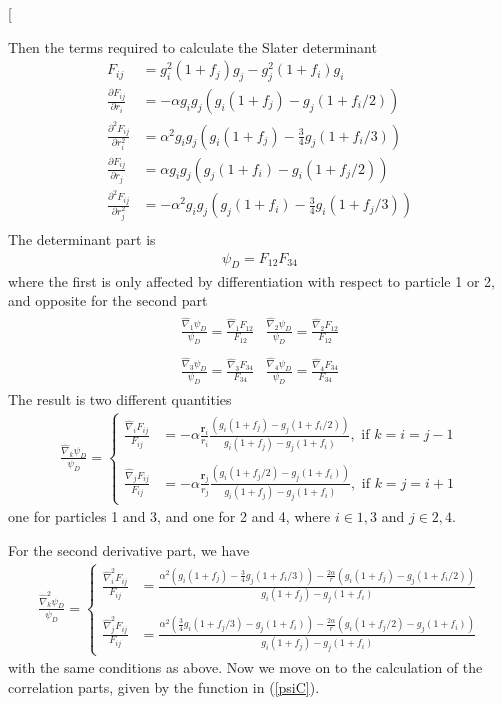 \documentclass[twocolumns, a4paper,11pt,fleqn]{extarticle}
\newcommand{\eq}[1]{{\small\begin{align*}#1\end{align*}}}
\newcommand{\mat}[1]{\begin{matrix}#1\end{matrix}}
\renewcommand\vec[1]{\boldsymbol{\mathbf{#1}}}
\newcommand{\op}[1]{\hat{#1}}
\begin{document}
\twocolumn[{%
Then the terms required to calculate the Slater determinant
\eq{
  F_{ij} &= g_i^2 (1+f_j)g_j - g_j^2 (1+f_i)g_i\\
  \frac{\partial F_{ij}}{\partial r_i} 
    &= -\alpha g_i g_j (g_i(1+f_j) - g_j (1+f_i/2))\\
  \frac{\partial^2 F_{ij}}{\partial r_i^2} 
    &= \alpha^2 g_i g_j (g_i(1+f_j) - \frac{3}{4} g_j (1+f_i/3))\\
  \frac{\partial F_{ij}}{\partial r_j} 
    &= \alpha g_i g_j (g_j(1+f_i) - g_i (1+f_j/2))\\
  \frac{\partial^2 F_{ij}}{\partial r_j^2} 
    &= -\alpha^2 g_i g_j (g_j(1+f_i) - \frac{3}{4} g_i (1+f_j/3))\\
}
The determinant part is
\eq{
  \psi_D = F_{12}F_{34}
}
where the first is only affected by differentiation with respect to particle 1 or 2,
and opposite for the second part
\eq{
  \mat{
    \frac{\op\nabla_1 \psi_D}{\psi_D} = \frac{\op\nabla_1 F_{12}}{F_{12}} &
    \frac{\op\nabla_2 \psi_D}{\psi_D} = \frac{\op\nabla_2 F_{12}}{F_{12}} \\\\
    \frac{\op\nabla_3 \psi_D}{\psi_D} = \frac{\op\nabla_3 F_{34}}{F_{34}} &
    \frac{\op\nabla_4 \psi_D}{\psi_D} = \frac{\op\nabla_4 F_{34}}{F_{34}}
  }
}
The result is two different quantities
\eq{
  \frac{\op\nabla_k \psi_D}{\psi_D} =
  \begin{cases}
    \frac{\op\nabla_i F_{ij}}{F_{ij}}
    &= -\alpha \frac{\vec r_i}{r_i} \frac{(g_i(1+f_j) 
      - g_j (1+f_i/2))}{g_i (1+f_j) - g_j (1+f_i)}
    ,\text{ if } k=i=j-1 \\\\
    \frac{\op\nabla_j F_{ij}}{F_{ij}}
    &= -\alpha \frac{\vec r_j}{r_j}\frac{(g_i (1+f_j/2) 
      - g_j(1+f_i))}{g_i (1+f_j) - g_j (1+f_i)}
    ,\text{ if } k=j=i+1
  \end{cases}
}
one for particles 1 and 3, and one for 2 and 4, where $i\in {1,3}$ and $j\in {2,4}$.

For the second derivative part, we have 
\eq{
  \frac{\op\nabla_k^2 \psi_D}{\psi_D} =
  \begin{cases}
    \frac{\op\nabla_i^2 F_{ij}}{F_{ij}}
    &= \frac{\alpha^2 (g_i(1+f_j) 
      - \frac{3}{4} g_j (1+f_i/3)) - \frac{2\alpha}{r}(g_i(1+f_j) - g_j (1+f_i/2))}
      {g_i (1+f_j) - g_j (1+f_i)}\\\\
    \frac{\op\nabla_j^2 F_{ij}}{F_{ij}}
    &= \frac{\alpha^2 (\frac{3}{4}g_i(1+f_j/3) 
      - g_j (1+f_i)) - \frac{2\alpha}{r}(g_i (1+f_j/2) 
      - g_j(1+f_i))}
      {g_i (1+f_j) - g_j (1+f_i)}
  \end{cases}
}
with the same conditions as above.
Now we move on to the calculation of the correlation parts,
given by the function in (\ref{psiC}). 

}
\end{document}
